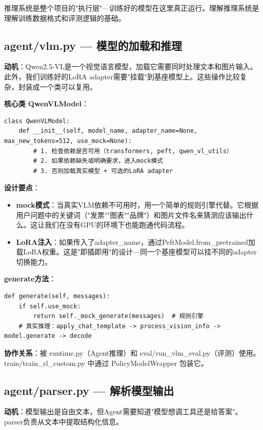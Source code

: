 \documentclass[fontset=none,11pt,a4paper]{ctexart}
\begin{document}
推理系统是整个项目的"执行层"---训练好的模型在这里真正运行。理解推理系统是理解训练数据格式和评测逻辑的基础。

\subsection{agent/vlm.py --- 模型的加载和推理}

\textbf{动机}：Qwen2.5-VL是一个视觉语言模型，加载它需要同时处理文本和图片输入。此外，我们训练好的LoRA adapter需要"挂载"到基座模型上。这些操作比较复杂，封装成一个类可以复用。

\textbf{核心类 QwenVLModel}：

\begin{lstlisting}
class QwenVLModel:
    def __init__(self, model_name, adapter_name=None, max_new_tokens=512, use_mock=None):
        # 1. 检查依赖是否可用（transformers, peft, qwen_vl_utils）
        # 2. 如果依赖缺失或明确要求，进入mock模式
        # 3. 否则加载真实模型 + 可选的LoRA adapter
\end{lstlisting}

\textbf{设计要点}：
\begin{itemize}[nosep]
    \item \textbf{mock模式}：当真实VLM依赖不可用时，用一个简单的规则引擎代替。它根据用户问题中的关键词（"发票""图表""品牌"）和图片文件名来猜测应该输出什么。这让我们在没有GPU的环境下也能跑通代码流程。
    \item \textbf{LoRA注入}：如果传入了adapter\_name，通过PeftModel.from\_pretrained加载LoRA权重。这是"即插即用"的设计---同一个基座模型可以挂不同的adapter切换能力。
\end{itemize}

\textbf{generate方法}：
\begin{lstlisting}
def generate(self, messages):
    if self.use_mock:
        return self._mock_generate(messages)  # 规则引擎
    # 真实推理：apply_chat_template -> process_vision_info -> model.generate -> decode
\end{lstlisting}

\textbf{协作关系}：被 runtime.py（Agent推理）和 eval/run\_vlm\_eval.py（评测）使用。train/train\_rl\_custom.py 中通过 PolicyModelWrapper 包装它。

\subsection{agent/parser.py --- 解析模型输出}

\textbf{动机}：模型输出是自由文本，但Agent需要知道"模型想调工具还是给答案"。parser负责从文本中提取结构化信息。
\end{document}
